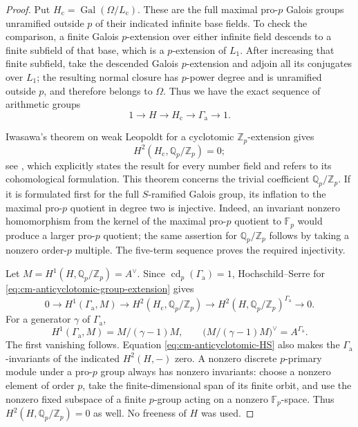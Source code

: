 \documentclass[11pt]{article}
\theoremstyle{definition}\newtheorem{definition}[theorem]{Definition}
\begin{document}
\begin{proof}
Put \(H_{\mathrm c}=\operatorname{Gal}(\Omega/L_{\mathrm c})\).
These are the full maximal pro-\(p\) Galois groups unramified outside
\(p\) of their indicated infinite base fields.
To check the comparison, a finite Galois \(p\)-extension over either
infinite field descends to a finite subfield of that base,
which is a \(p\)-extension of \(L_1\).
After increasing that finite subfield, take the descended
Galois \(p\)-extension and adjoin all its conjugates over \(L_1\);
the resulting normal closure has \(p\)-power degree and is
unramified outside \(p\), and therefore belongs to \(\Omega\).
Thus we have the exact sequence of arithmetic groups
\begin{equation}\label{eq:cm-anticyclotomic-group-extension}
 1\longrightarrow H\longrightarrow H_{\mathrm c}
                 \longrightarrow\Gamma_{\mathrm a}
                 \longrightarrow1 .
\end{equation}

Iwasawa's theorem on weak Leopoldt for a cyclotomic
\(\mathbb Z_p\)-extension gives
\[
 H^2(H_{\mathrm c},\mathbb Q_p/\mathbb Z_p)=0;
\]
see \cite[Remark 4.3, author version p.~26]{VenjakobIwasawa},
which explicitly states the result for every number field and
refers to its cohomological formulation.
This theorem concerns the trivial coefficient
\(\mathbb Q_p/\mathbb Z_p\).
If it is formulated first for the full \(S\)-ramified Galois
group, its inflation to the maximal pro-\(p\) quotient in degree
two is injective.
Indeed, an invariant nonzero homomorphism from the kernel of
the maximal pro-\(p\) quotient to \(\mathbb F_p\) would produce
a larger pro-\(p\) quotient; the same assertion for
\(\mathbb Q_p/\mathbb Z_p\) follows by taking a nonzero
order-\(p\) multiple.
The five-term sequence proves the required injectivity.

Let \(M=H^1(H,\mathbb Q_p/\mathbb Z_p)=A^\vee\).
Since \(\operatorname{cd}_p(\Gamma_{\mathrm a})=1\),
Hochschild--Serre for
\eqref{eq:cm-anticyclotomic-group-extension} gives
\begin{equation}\label{eq:cm-anticyclotomic-HS}
 0\longrightarrow H^1(\Gamma_{\mathrm a},M)
 \longrightarrow H^2(H_{\mathrm c},\mathbb Q_p/\mathbb Z_p)
 \longrightarrow
 H^2(H,\mathbb Q_p/\mathbb Z_p)^{\Gamma_{\mathrm a}}
 \longrightarrow0 .
\end{equation}
For a generator \(\gamma\) of \(\Gamma_{\mathrm a}\),
\[
 H^1(\Gamma_{\mathrm a},M)=M/(\gamma-1)M,
 \qquad
 \bigl(M/(\gamma-1)M\bigr)^\vee=A^{\Gamma_{\mathrm a}}.
\]
The first vanishing follows.
Equation \eqref{eq:cm-anticyclotomic-HS} also makes the
\(\Gamma_{\mathrm a}\)-invariants of the indicated \(H^2(H,-)\)
zero.
A nonzero discrete \(p\)-primary module under a pro-\(p\) group
always has nonzero invariants: choose a nonzero element of order
\(p\), take the finite-dimensional span of its finite orbit,
and use the nonzero fixed subspace of a finite \(p\)-group
acting on a nonzero \(\mathbb F_p\)-space.
Thus \(H^2(H,\mathbb Q_p/\mathbb Z_p)=0\) as well.
No freeness of \(H\) was used.
\end{proof}
\end{document}
